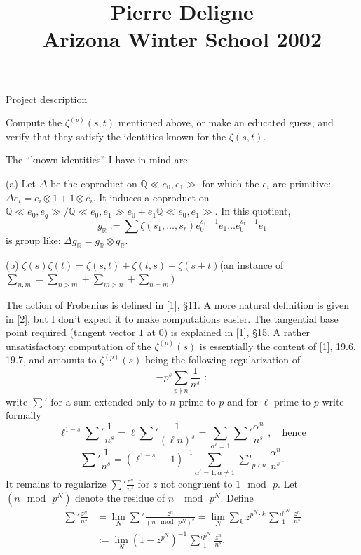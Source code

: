 \documentclass[12pt,leqno]{article}
\title{\titlefont Pierre Deligne\\Arizona Winter School 2002}
\author{}
\date{}
\newcommand{\dbQ}{{\mathbb{Q}}}
\newcommand{\dbR}{{\mathbb{R}}}
\newcommand{\dspace}{\lineskip=2pt
     \baselineskip=18pt\lineskiplimit=0pt}
\begin{document}
\maketitle

\bigskip
\dspace
\noindent
{\sectionfont Project description}


Compute the $\zeta^{(p)}(s,t)$ mentioned
above, or make an educated guess, and verify
that they satisfy the identities known for the
$\zeta(s,t)$.

The ``known identities'' I have in mind are:

\medskip\noindent
{\sectionfont (a)}\enspace
Let $\Delta$ be the coproduct on $\dbQ\ll
e_0,e_1\gg$ for which the $e_i$ are primitive:
$\Delta e_i=e_i\otimes 1+1\otimes e_i$.
It induces a coproduct on $\dbQ\ll
e_0,e_q\gg/\dbQ\ll e_0,e_1\gg e_0+e_1\dbQ
\ll e_0,e_1\gg$.
In this quotient,
$$
g_{\dbR}:= \sum\zeta(s_1,\dotsc,s_r)
e_0^{s_1-1}e_1\ldots e_0^{s_r-1}e_1
$$
is group like: $\Delta
g_{\dbR}=g_{\dbR}\otimes g_{\dbR}$.

\medskip\noindent
{\sectionfont (b)}\enspace
$\zeta(s)\zeta(t)=\zeta(s,t)+\zeta(t,s)+
\zeta(s+t)$\quad (an instance of
$\sum\limits_{n,m}=\sum\limits_{n>m}
+\sum\limits_{m>n}+\sum\limits_{n=m}$)

\medskip
The action of Frobenius is defined in 
[1], \S{11}.
A more natural definition is given in 
[2], but I don't expect it to make
computations easier.
The tangential base point required (tangent
vector $1$ at $0$) is explained in
[1], \S{15}.
A rather unsatisfactory computation of the
$\zeta^{(p)}(s)$ is essentially the content of
[1], 19.6, 19.7, and amounts to
$\zeta^{(p)}(s)$ being the following
regularization of
$$
-p^s\sum\limits_{p\nmid n}\frac{1}{n^s}\,\,:
$$
write ${{\sum}'}$ for a sum extended only to $n$
prime to $p$ and for $\ell$ prime to $p$ write
formally
$$
\ell^{1-s}{{\sum}'}\frac{1}{n^s}=\ell{{\sum}'}
\frac{1}{(\ell n)^s}=\sum\limits_{\alpha^\ell=1}
{{\sum}'}\frac{\alpha^n}{n^s}\,\,,\quad \text{hence}
$$
$$
{{\sum}'}\frac{1}{n^s}=(\ell^{1-s}-1)^{-1}
\sum\limits_{\alpha^\ell=1,\alpha\not=1}
\mathop{{\sum}'}_{p\nmid n}
\frac{\alpha^n}{n^s}.
$$
It remains to regularize
${{\sum}'}\frac{z^n}{n^s}$ for $z$ not
congruent to $1\mod\,p$.
Let $(n\mod\,p^N)$ denote the residue of $n$
$\mod\,p^N$.
Define
\begin{align*}
{{\sum}'}\frac{z^n}{n^s} &=\lim\limits_{N}
{{\sum}'}\frac{z^n}{(n\mod\,p^N)^s}=
\lim\limits_{N}\sum\limits_{k}z^{p^N\cdot k}
\mathop{{\sum}'}_1^{p^N} \frac{z^n}{n^s}\\
&:=\lim\limits_{N}(1-z^{p^N})^{-1}
\mathop{{\sum}'}_1^{p^N}\frac{z^n}{n^s}.
\end{align*}
\end{document}
